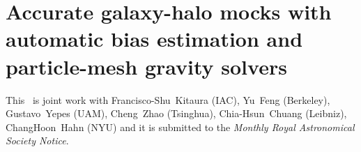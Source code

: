 \def\pvm#1{[PM: {\it #1}] }
\def\pvm2#1{}

\newcommand{\be}{\begin{equation}}
\newcommand{\ee}{\end{equation}}
\newcommand{\ba}{\begin{eqnarray}}
\newcommand{\ea}{\end{eqnarray}}
\newcommand{\mperh}{\,h^{-1}\,{\rm Mpc}}
\newcommand{\hperm}{\,h\,{\rm Mpc}^{-1}}


%

\chapter{Accurate galaxy-halo mocks with automatic bias estimation and particle-mesh gravity solvers}

This \paper\ is joint work with Francisco-Shu~Kitaura (IAC), Yu~Feng (Berkeley),  Gustavo~Yepes (UAM), Cheng~Zhao (Tsinghua), Chia-Hsun~Chuang (Leibniz), ChangHoon~Hahn (NYU) and it is submitted to the \emph{Monthly Royal Astronomical Society Notice}.


